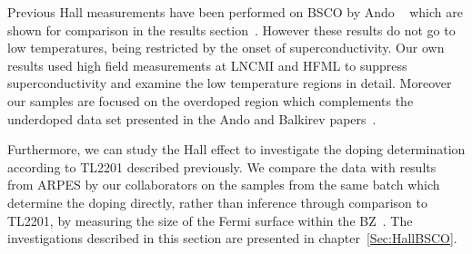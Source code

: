 Previous Hall measurements have been performed on \ac{BSCO} by Ando \etal~\cite{Ando1999, Ando2000} which are shown for comparison in the results section~\cite{Ando1999}. However these results do not go to low temperatures, being restricted by the onset of superconductivity. Our own results used high field measurements at \ac{LNCMI} and \ac{HFML} to suppress superconductivity and examine the low temperature regions in detail. Moreover our samples are focused on the overdoped region which complements the underdoped data set presented in the Ando and Balkirev papers~\cite{Balakirev2003}.

Furthermore, we can study the Hall effect to investigate the doping determination according to \ac{TL2201} described previously. We compare the data with results from \ac{ARPES} by our collaborators on the samples from the same batch which determine the doping directly, rather than inference through comparison to \ac{TL2201}, by measuring the size of the Fermi surface within the \ac{BZ}~\cite{Kondo2004}. The investigations described in this section are presented in chapter~\ref{Sec:HallBSCO}.



